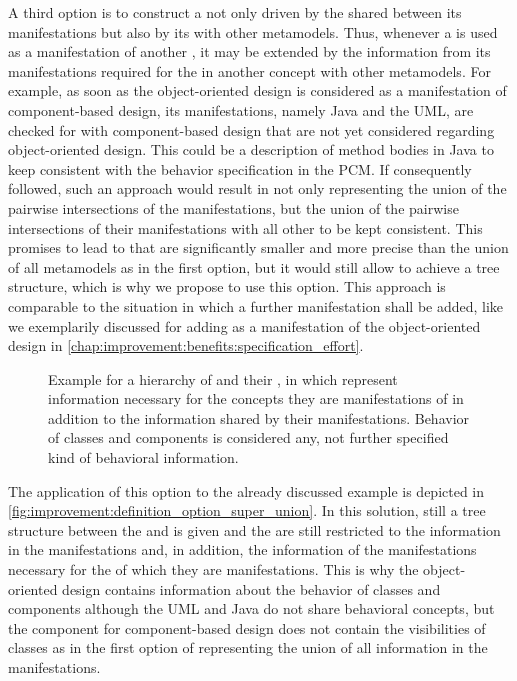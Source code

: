 A third option is to construct a \conceptmetamodel not only driven by the \commonalities shared between its manifestations but also by its \commonalities with other metamodels.
Thus, whenever a \conceptmetamodel is used as a manifestation of another \conceptmetamodel, it may be extended by the information from its manifestations required for the \commonalities in another concept with other metamodels.
For example, as soon as the object-oriented design \conceptmetamodel is considered as a manifestation of component-based design, its manifestations, namely Java and the \gls{UML}, are checked for \commonalities with component-based design that are not yet considered \commonalities regarding object-oriented design.
This could be a description of method bodies in Java to keep consistent with the behavior specification in the \gls{PCM}.
If consequently followed, such an approach would result in \conceptmetamodels not only representing the union of the pairwise intersections of the manifestations, but the union of the pairwise intersections of their manifestations with all other \concretemetamodels to be kept consistent.
This promises to lead to \conceptmetamodels that are significantly smaller and more precise than the union of all metamodels as in the first option, but it would still allow to achieve a tree structure, which is why we propose to use this option.
This approach is comparable to the situation in which a further manifestation shall be added, like we exemplarily discussed for adding \cplusplus as a manifestation of the object-oriented design \conceptmetamodel in \autoref{chap:improvement:benefits:specification_effort}.

\begin{figure}
    \centering
    
    \caption[\Commonalities including information of their concepts]{Example for a hierarchy of \conceptmetamodels and their \commonalities, in which \commonalities represent information necessary for the concepts they are manifestations of in addition to the information shared by their manifestations. Behavior of classes and components is considered any, not further specified kind of behavioral information.}
    \label{fig:improvement:definition_option_super_union}
\end{figure}

The application of this option to the already discussed example is depicted in \autoref{fig:improvement:definition_option_super_union}.
In this solution, still a tree structure between the \metaclasses and \commonalities is given and the \conceptmetamodels are still restricted to the information in the manifestations and, in addition, the information of the manifestations necessary for the \conceptmetamodels of which they are manifestations.
This is why the object-oriented design \conceptmetamodel contains information about the behavior of classes and components although the \gls{UML} and Java do not share behavioral concepts, but the component \commonality for component-based design does not contain the visibilities of classes as in the first option of representing the union of all information in the manifestations.

